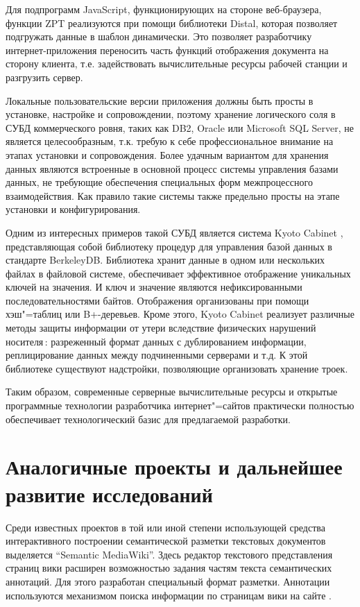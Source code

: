 \documentclass[utf8]{../IncArticle}
\begin{document}
Для подпрограмм JavaScript, функционирующих на стороне веб-браузера,
функции ZPT реализуются при помощи библиотеки Distal, которая
позволяет подгружать данные в шаблон динамически.  Это позволяет
разработчику интернет-приложения переносить часть функций отображения
документа на сторону клиента, т.е. задействовать вычислительные
ресурсы рабочей станции и разгрузить сервер.

Локальные пользовательские версии приложения должны быть просты в
установке, настройке и сопровождении, поэтому хранение логического
соля в СУБД коммерческого ровня, таких как DB2, Oracle или Microsoft
SQL Server, не является целесообразным, т.к. требую к себе
профессиональное внимание на этапах установки и сопровождения.  Более
удачным вариантом для хранения данных являются встроенные в основной
процесс системы управления базами данных, не требующие обеспечения
специальных форм межпроцессного взаимодействия.  Как правило такие
системы также предельно просты на этапе установки и конфигурирования.

Одним из интересных примеров такой СУБД является система Kyoto Cabinet
\cite{kyoto}, представляющая собой библиотеку процедур для управления
базой данных в стандарте BerkeleyDB. Библиотека хранит данные в одном
или нескольких файлах в файловой системе, обеспечивает эффективное
отображение уникальных ключей на значения.  И ключ и значение являются
нефиксированными последовательностями байтов.  Отображения
организованы при помощи хэш"=таблиц или B+-деревьев.  Кроме этого,
Kyoto Cabinet реализует различные методы защиты информации от утери
вследствие физических нарушений носителя\,: разреженный формат данных
с дублированием информации, реплицирование данных между подчиненными
серверами и т.д.  К этой библиотеке существуют надстройки, позволяющие
организовать хранение троек.

Таким образом, современные серверные вычислительные ресурсы и открытые
программные технологии разработчика интернет"=сайтов практически
полностью обеспечивает технологический базис для предлагаемой
разработки.

\section{Аналогичные проекты и дальнейшее развитие исследований}

Среди известных проектов в той или иной степени использующей средства
интерактивного построении семантической разметки текстовых документов
выделяется “Semantic MediaWiki”.  Здесь редактор текстового
представления страниц вики расширен возможностью задания частям текста
семантических аннотаций.  Для этого разработан специальный формат
разметки.  Аннотации используются механизмом поиска информации по
страницам вики на сайте \cite{b1:13}.
\end{document}
